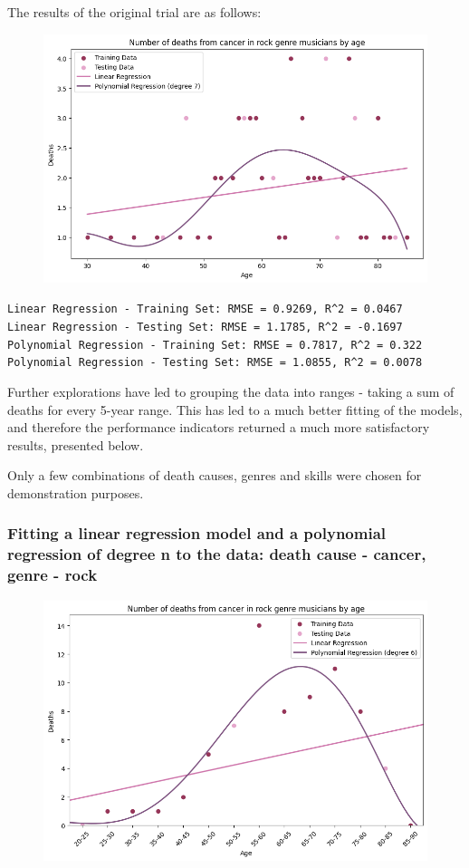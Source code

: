 \documentclass{article}
\begin{document}
The results of the original trial are as follows:

\begin{figure} [H]
    \centering
    \includegraphics[width=0.6\linewidth]{graph_images/experiments/failed.png}
    \label{fig:enter-label}
\end{figure}

\noindent\texttt{Linear Regression - Training Set: RMSE = 0.9269, R\textasciicircum2 = 0.0467\\
Linear Regression - Testing Set: RMSE = 1.1785, R\textasciicircum2 = -0.1697\\
Polynomial Regression - Training Set: RMSE = 0.7817, R\textasciicircum2 = 0.322\\
Polynomial Regression - Testing Set: RMSE = 1.0855, R\textasciicircum2 = 0.0078\\}


Further explorations have led to grouping the data into ranges - taking a sum of deaths for every 5-year range. This has led to a much better fitting of the models, and therefore the performance indicators returned a much more satisfactory results, presented below.

Only a few combinations of death causes, genres and skills were chosen for demonstration purposes.



\subsubsection{Fitting a linear regression model and a polynomial regression of degree n to the data: death cause - cancer, genre - rock}

\begin{figure} [H]
    \centering
    \includegraphics[width=0.6\linewidth]{graph_images/experiments/exp1.png}
    \label{fig:enter-label}
\end{figure}
\end{document}
